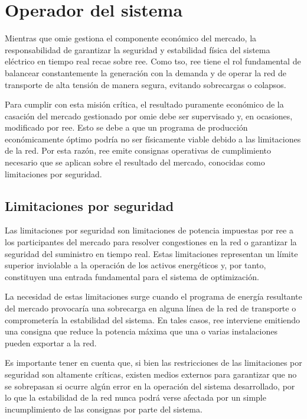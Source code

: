 \section{Operador del sistema}%
\label{makereference4.2}

Mientras que \gls{omie} gestiona el componente económico del mercado, la responsabilidad de garantizar la seguridad y estabilidad física del sistema eléctrico en tiempo real recae sobre \gls{ree}. Como \gls{tso}, \gls{ree} tiene el rol fundamental de balancear constantemente la generación con la demanda y de operar la red de transporte de alta tensión de manera segura, evitando sobrecargas o colapsos.

Para cumplir con esta misión crítica, el resultado puramente económico de la casación del mercado gestionado por \gls{omie} debe ser supervisado y, en ocasiones, modificado por \gls{ree}. Esto se debe a que un programa de producción económicamente óptimo podría no ser físicamente viable debido a las limitaciones de la red. Por esta razón, \gls{ree} emite consignas operativas de cumplimiento necesario que se aplican sobre el resultado del mercado, conocidas como limitaciones por seguridad.

\subsection{Limitaciones por seguridad}%
\label{makereference4.2.1}

Las limitaciones por seguridad son limitaciones de potencia impuestas por \gls{ree} a los participantes del mercado para resolver congestiones en la red o garantizar la seguridad del suministro en tiempo real. Estas limitaciones representan un límite superior inviolable a la operación de los activos energéticos y, por tanto, constituyen una entrada fundamental para el sistema de optimización.

La necesidad de estas limitaciones surge cuando el programa de energía resultante del mercado provocaría una sobrecarga en alguna línea de la red de transporte o comprometería la estabilidad del sistema. En tales casos, \gls{ree} interviene emitiendo una consigna que reduce la potencia máxima que una o varias instalaciones pueden exportar a la red.

Es importante tener en cuenta que, si bien las restricciones de las limitaciones por seguridad son altamente críticas, existen medios externos para garantizar que no se sobrepasan si ocurre algún error en la operación del sistema desarrollado, por lo que la estabilidad de la red nunca podrá verse afectada por un simple incumplimiento de las consignas por parte del sistema.

